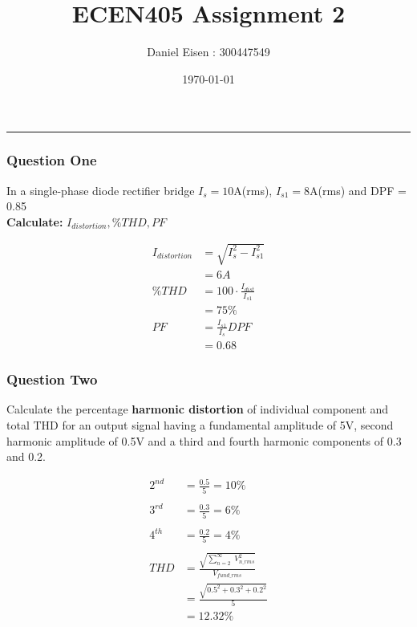 \documentclass[a4paper,11pt]{article}
\begin{document}
\title{\LARGE{\textbf{ECEN405 Assignment 2}}}
\author{Daniel Eisen : 300447549}
\date{\today}
\maketitle
\hrule

\subsubsection*{Question One}

In a single-phase diode rectifier bridge $I_s = 10$A(rms), $I_{s1}=8$A(rms) and DPF = 0.85\\
\textbf{Calculate:} $I_{distortion}, \%THD, PF$

\begin{align*}
    I_{distortion} & = \sqrt{I_{s}^{2}-I_{s1}^{2}}     \\
                   & = 6A                              \\
    \%THD          & = 100\cdot\frac{I_{dist}}{I_{s1}} \\
                   & = 75\%                            \\
    PF             & = \frac{I_{s1}}{I_{s}}DPF         \\
                   & = 0.68
\end{align*}

\subsubsection*{Question Two}
Calculate the percentage \textbf{harmonic distortion} of individual component and total THD for an output signal having a fundamental amplitude of 5V, second harmonic amplitude of 0.5V and a third and fourth harmonic components of 0.3 and 0.2.

\begin{align*}
    2^{nd} & = \frac{0.5}{5} = 10\%                                                \\\\
    3^{rd} & = \frac{0.3}{5} = 6\%                                                 \\\\
    4^{th} & = \frac{0.2}{5} = 4\%                                                 \\\\
    THD         & = \frac{\sqrt{ \sum_{n=2}^{\infty} \; V^2_{n\_rms} }}{ V_{fund\_rms}} \\
                & = \frac{\sqrt{ 0.5^2 + 0.3^2 + 0.2^2 }}{ 5 }                          \\
                & = 12.32\%
\end{align*}
\end{document}
